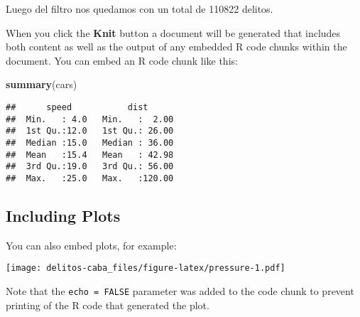 \documentclass[]{article}
\newenvironment{Shaded}{\begin{snugshade}}{\end{snugshade}}
\newcommand{\KeywordTok}[1]{\textcolor[rgb]{0.13,0.29,0.53}{\textbf{#1}}}
\newcommand{\NormalTok}[1]{#1}
\begin{document}
Luego del filtro nos quedamos con un total de 110822 delitos.

When you click the \textbf{Knit} button a document will be generated
that includes both content as well as the output of any embedded R code
chunks within the document. You can embed an R code chunk like this:

\begin{Shaded}
\begin{Highlighting}[]
\KeywordTok{summary}\NormalTok{(cars)}
\end{Highlighting}
\end{Shaded}

\begin{verbatim}
##      speed           dist       
##  Min.   : 4.0   Min.   :  2.00  
##  1st Qu.:12.0   1st Qu.: 26.00  
##  Median :15.0   Median : 36.00  
##  Mean   :15.4   Mean   : 42.98  
##  3rd Qu.:19.0   3rd Qu.: 56.00  
##  Max.   :25.0   Max.   :120.00
\end{verbatim}

\hypertarget{including-plots}{%
\subsection{Including Plots}\label{including-plots}}

You can also embed plots, for example:

\texttt{[image: delitos-caba\_files/figure-latex/pressure-1.pdf]}

Note that the \texttt{echo\ =\ FALSE} parameter was added to the code
chunk to prevent printing of the R code that generated the plot.
\end{document}
